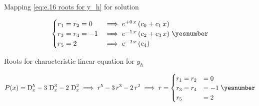 \documentclass["AM3C-Slides_annotations.tex"]{subfiles}
\begin{document}
\begin{exampleBox}
  Mapping \eqref{eq:e.16 roots for y_h} for solution
  \begin{tcolorbox}
    \begin{gather*}
      \begin{cases}
        r_1 = r_2 = 0
        &\implies 
        e^{+0\,x}\,(c_0 + c_1\,x)
        \\
        r_3 = r_4 = -1
        &\implies 
        e^{-1\,x}\,(c_2 + c_3\,x)
        \\
        r_5 = 2
        & \implies
        e^{-2\,x}\,(c_4)
      \end{cases}
      \yesnumber\label{eq:e.16 mapped roots for y_h}
    \end{gather*}
  \end{tcolorbox}

  Roots for characteristic linear equation for \(y_h\)
  \begin{tcolorbox}
    \begin{gather*}
      P(x)
      = \mdif[5]{x} -3\,\mdif[3]{x} -2\,\mdif[2]{x}
      \implies
      r^5 -3\,r^3 -2\,r^2
      \implies
      r = \begin{cases}
        r_1 = r_2 &= 0
        \\ r_3 = r_4 &= -1
        \\ r_5 &= 2
      \end{cases}
      \yesnumber\label{eq:e.16 roots for y_h}
    \end{gather*}
  \end{tcolorbox}
\end{exampleBox}
\end{document}
